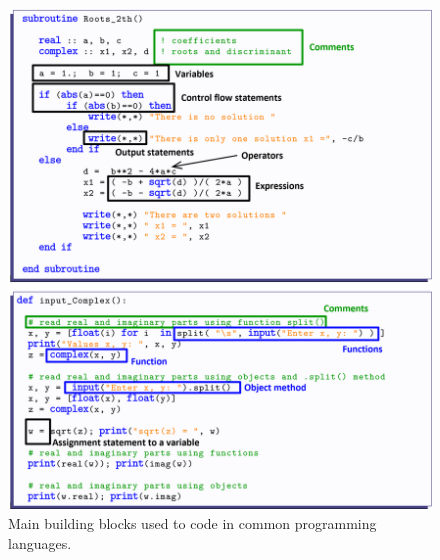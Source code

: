 \begin{figure}[h]
    \centering
    \includegraphics[width=.95\textwidth]{./doc/Figures/components.png}
    \caption{Main building blocks used to code in common programming languages.}
    \label{fig:components}
\end{figure}
\FloatBarrier














